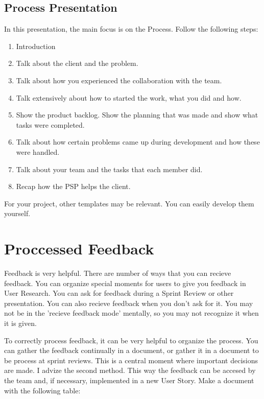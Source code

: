 \documentclass[10pt]{report}
\begin{document}
\subsection{Process Presentation}

In this presentation, the main focus is on the Process. Follow the following steps:

\begin{enumerate}
	\item Introduction
	\item Talk about the client and the problem.
	\item Talk about how you experienced the collaboration with the team.
	\item Talk extensively about how to started the work, what you did and how.
	\item Show the product backlog. Show the planning that was made and show what tasks were completed.
	\item Talk about how certain problems came up during development and how these were handled.
	\item Talk about your team and the tasks that each member did.
	\item Recap how the PSP helps the client.
\end{enumerate}

\noindent For your project, other templates may be relevant. You can easily develop them yourself.

\newpage

\section{Proccessed Feedback}

Feedback is very helpful. There are number of ways that you can recieve feedback. You can organize special moments for users to give you feedback in User Research. You can ask for feedback during a Sprint Review or other presentation. You can also recieve feedback when you don't ask for it. You may not be in the 'recieve feedback mode' mentally, so you may not recognize it when it is given.

\medskip

\noindent To correctly process feedback, it can be very helpful to organize the process. You can gather the feedback continually in a document, or gather it in a document to be process at sprint reviews. This is a central moment where important decisions are made. I advize the second method. This way the feedback can be accesed by the team and, if necessary, implemented in a new User Story. Make a document with the following table:
\end{document}
